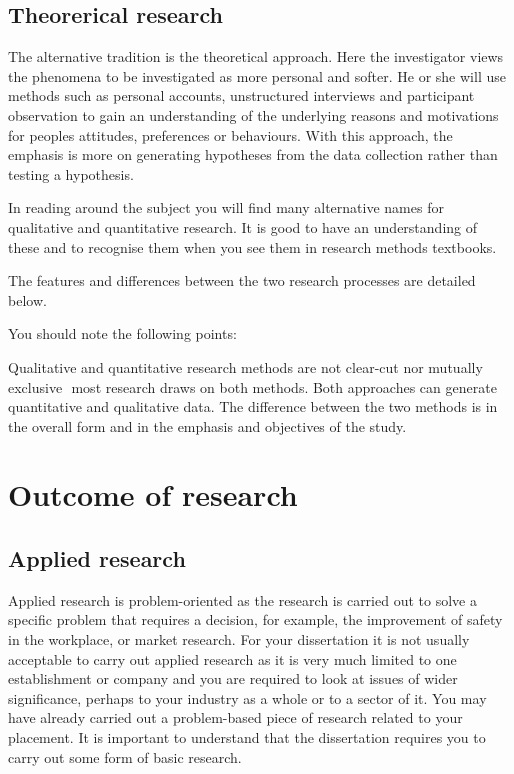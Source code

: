 \documentclass[12pt, a4paper]{report}
\begin{document}
\subsection{Theorerical research}
The alternative tradition is the theoretical approach. Here the investigator views the phenomena to be investigated as more personal and softer. He or she will use methods such as personal accounts, unstructured interviews and participant observation to gain an understanding of the underlying reasons and motivations for peoples attitudes, preferences or behaviours. With this approach, the emphasis is more on generating hypotheses from the data collection rather than testing a hypothesis.

In reading around the subject you will find many alternative names for qualitative and quantitative research. It is good to have an understanding of these and to recognise them when you see them in research methods textbooks.

The features and differences between the two research processes are detailed below.

You should note the following points:

Qualitative and quantitative research methods are not clear-cut nor mutually exclusive  most research draws on both methods.
Both approaches can generate quantitative and qualitative data.
The difference between the two methods is in the overall form and in the emphasis and objectives of the study.


\section{Outcome of research}
\subsection{Applied research}
Applied research is problem-oriented as the research is carried out to solve a specific problem that requires a decision, for example, the improvement of safety in the workplace, or market research. For your dissertation it is not usually acceptable to carry out applied research as it is very much limited to one establishment or company and you are required to look at issues of wider significance, perhaps to your industry as a whole or to a sector of it. You may have already carried out a problem-based piece of research related to your placement. It is important to understand that the dissertation requires you to carry out some form of basic research.
\end{document}
